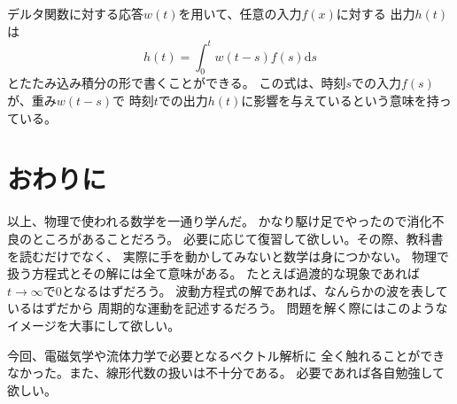 \documentclass{jarticle}
\newcommand{\diff}{\mathrm d}
\begin{document}
デルタ関数に対する応答$w(t)$を用いて、任意の入力$f(x)$に対する
出力$h(t)$は
\begin{equation}
  h(t) = \int_0^t w(t-s) f(s) \diff s
\end{equation}
とたたみ込み積分の形で書くことができる。
この式は、時刻$s$での入力$f(s)$が、重み$w(t-s)$で
時刻$t$での出力$h(t)$に影響を与えているという意味を持っている。

\section{おわりに}

以上、物理で使われる数学を一通り学んだ。
かなり駆け足でやったので消化不良のところがあることだろう。
必要に応じて復習して欲しい。その際、教科書を読むだけでなく、
実際に手を動かしてみないと数学は身につかない。
物理で扱う方程式とその解には全て意味がある。
たとえば過渡的な現象であれば$t\rightarrow \infty$で$0$となるはずだろう。
波動方程式の解であれば、なんらかの波を表しているはずだから
周期的な運動を記述するだろう。
問題を解く際にはこのようなイメージを大事にして欲しい。

今回、電磁気学や流体力学で必要となるベクトル解析に
全く触れることができなかった。また、線形代数の扱いは不十分である。
必要であれば各自勉強して欲しい。
\end{document}
